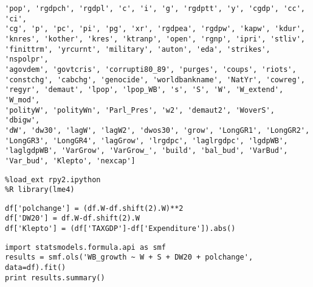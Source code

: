 \documentclass[12pt,fleqn]{article}\usepackage{common}
\begin{document}
\begin{verbatim}
'pop', 'rgdpch', 'rgdpl', 'c', 'i', 'g', 'rgdptt', 'y', 'cgdp', 'cc', 'ci',
'cg', 'p', 'pc', 'pi', 'pg', 'xr', 'rgdpea', 'rgdpw', 'kapw', 'kdur',
'knres', 'kother', 'kres', 'ktranp', 'open', 'rgnp', 'ipri', 'stliv',
'finittrm', 'yrcurnt', 'military', 'auton', 'eda', 'strikes', 'nspolpr',
'agovdem', 'govtcris', 'corrupti80_89', 'purges', 'coups', 'riots',
'constchg', 'cabchg', 'genocide', 'worldbankname', 'NatYr', 'cowreg',
'regyr', 'demaut', 'lpop', 'lpop_WB', 's', 'S', 'W', 'W_extend', 'W_mod',
'polityW', 'polityWn', 'Parl_Pres', 'w2', 'demaut2', 'WoverS', 'dbigw',
'dW', 'dw30', 'lagW', 'lagW2', 'dwos30', 'grow', 'LongGR1', 'LongGR2',
'LongGR3', 'LongGR4', 'lagGrow', 'lrgdpc', 'laglrgdpc', 'lgdpWB',
'laglgdpWB', 'VarGrow', 'VarGrow_', 'build', 'bal_bud', 'VarBud',
'Var_bud', 'Klepto', 'nexcap'] 
\end{verbatim}

\begin{verbatim}
%load_ext rpy2.ipython
%R library(lme4)
\end{verbatim}

\begin{verbatim}
df['polchange'] = (df.W-df.shift(2).W)**2
df['DW20'] = df.W-df.shift(2).W
df['Klepto'] = (df['TAXGDP']-df['Expenditure']).abs()
\end{verbatim}

\begin{verbatim}
import statsmodels.formula.api as smf
results = smf.ols('WB_growth ~ W + S + DW20 + polchange', data=df).fit()
print results.summary()
\end{verbatim}
\end{document}
